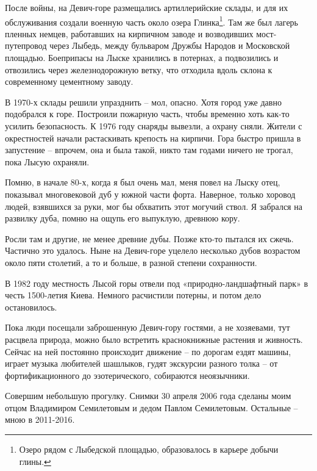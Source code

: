 После войны, на Девич-горе размещались артиллерийские склады, и для их обслуживания создали военную часть около озера Глинка\footnote{Озеро рядом с Лыбедской площадью, образовалось в карьере добычи глины.}. Там же был лагерь пленных немцев, работавших на кирпичном заводе и возводивших мост-путепровод через Лыбедь, между бульваром Дружбы Народов и Московской площадью. Боеприпасы на Лыске хранились в потернах, а подвозились и отвозились через железнодорожную ветку, что отходила вдоль склона к современному цементному заводу.

В 1970-х склады решили упразднить – мол, опасно. Хотя город уже давно подобрался к горе. Построили пожарную часть, чтобы временно хоть как-то усилить безопасность. К 1976 году снаряды вывезли, а охрану сняли. Жители с окрестностей начали растаскивать крепость на кирпичи. Гора быстро пришла в запустение – впрочем, она и была такой, никто там годами ничего не трогал, пока Лысую охраняли.

Помню, в начале 80-х, когда я был очень мал, меня повел на Лыску отец, показывал многовековой дуб у южной части форта. Наверное, только хоровод людей, взявшихся за руки, мог бы обхватить этот могучий ствол. Я забрался на развилку дуба, помню на ощупь его выпуклую, древнюю кору.

Росли там и другие, не менее древние дубы. Позже кто-то пытался их сжечь. Частично это удалось. Ныне на Девич-горе уцелело несколько дубов возрастом около пяти столетий, а то и больше, в разной степени сохранности.
 

В 1982 году местность Лысой горы отвели под «природ\-но-ландшафтный парк» в честь 1500-летия Киева. Немного расчистили потерны, и потом дело остановилось.

Пока люди посещали заброшенную Девич-гору гостями, а не хозяевами, тут расцвела природа, можно было встретить краснокнижные растения и живность. Сейчас на ней постоянно происходит движение – по дорогам ездят машины, играет музыка любителей шашлыков, гудят экскурсии разного толка – от фортификационного до эзотерического, собираются неоязычники. 

Совершим небольшую прогулку. Снимки 30 апреля 2006 года сделаны моим отцом Владимиром Семилетовым и дедом Павлом Семилетовым. Остальные – мною в 2011-2016.



